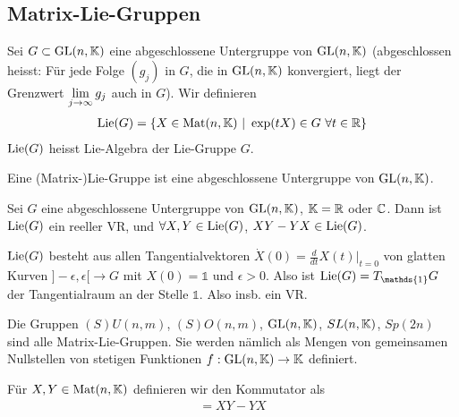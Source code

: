 \subsection{Matrix-Lie-Gruppen}

\begin{definition}
    Sei $G \subset \text{GL}(n,\mathbb{K})$ eine abgeschlossene Untergruppe von $\text{GL}(n,\mathbb{K})$
    (abgeschlossen heisst: Für jede Folge $(g_j)$ in $G$, die in $\text{GL}(n,\mathbb{K})$
    konvergiert, liegt der Grenzwert $\lim\limits_{j \rightarrow \infty} g_j$ auch
    in $G$). Wir definieren
    \begin{align*}
        \text{Lie}(G)= \left\{ X \in \text{Mat}(n,\mathbb{K}) \ | \ \exp(t X) \in G \ \forall t \in \mathbb{R} \right\}
    \end{align*}
    $\text{Lie}(G)$ heisst Lie-Algebra der Lie-Gruppe $G$.
\end{definition}

\begin{definition}
    Eine (Matrix-)Lie-Gruppe ist eine abgeschlossene Untergruppe von $\text{GL}(n,\mathbb{K})$.
\end{definition}

\begin{satz}
    Sei $G$ eine abgeschlossene Untergruppe von $\text{GL}(n,\mathbb{K})$, $\mathbb{K} = \mathbb{R}$ oder $\mathbb{C}$.
    Dann ist $\text{Lie}(G)$ ein reeller VR, und $\forall X,Y \in \text{Lie}(G)$,
    $X Y - Y X \in \text{Lie}(G)$.
\end{satz}

\begin{lemma}
    $\text{Lie}(G)$ besteht aus allen Tangentialvektoren $\dot{X}(0) = \frac{d}{dt}
    X(t) |_{t=0}$ von glatten Kurven $]-\epsilon,\epsilon[ \rightarrow G$ mit
    $X(0) = \mathds{1}$ und $\epsilon > 0$. Also ist $\Lie(G) = T_{\mathds{1}} G$
    der Tangentialraum an der Stelle $\mathds{1}$. Also insb. ein VR.
\end{lemma}

\begin{bemerkung}
    Die Gruppen $(S)U(n,m)$, $(S)O(n,m)$, $\text{GL}(n,\mathbb{K})$, $SL(n,\mathbb{K})$, $Sp(2n)$
    sind alle Matrix-Lie-Gruppen. Sie werden nämlich als Mengen von gemeinsamen
    Nullstellen von stetigen Funktionen $f: \text{GL}(n,\mathbb{K}) \rightarrow \mathbb{K}$ definiert.
\end{bemerkung}

\begin{definition}[Kommutator]
    Für $X,Y \in \text{Mat}(n,\mathbb{K})$ definieren wir den Kommutator als
    \begin{align*}
        [X,Y] = XY - YX
    \end{align*}
\end{definition}

